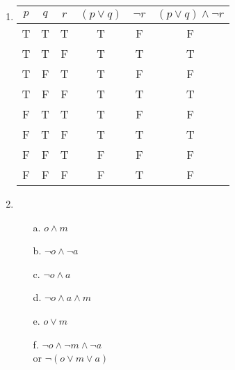 \begin{enumerate}
        \item
            \begin{tabular}{c c c | c | c | c}
                $p$ & $q$ & $r$ &
                    $(p \lor q)$ &
                    $\neg r$ &
                    $(p \lor q) \land \neg r$
                \\ \hline
                T & T & T &     T &     F &     F
                \\
                T & T & F &     T &     T &     T
                \\
                T & F & T &     T &     F &     F
                \\
                T & F & F &     T &     T &     T
                \\
                F & T & T &     T &     F &     F
                \\
                F & T & F &     T &     T &     T
                \\
                F & F & T &     F &     F &     F
                \\
                F & F & F &     F &     T &     F
            \end{tabular}

        \item
            \begin{itemize}
                \item[a.]   $o \land m$
                \item[b.]   $\neg o \land \neg a$
                \item[c.]   $\neg o \land a$
                \item[d.]   $\neg o \land a \land m$
                \item[e.]   $o \lor m$
                \item[f.]   $\neg o \land \neg m \land \neg a$ \\ or
                            $\neg (o \lor m \lor a)$
            \end{itemize}
            

\end{enumerate}
